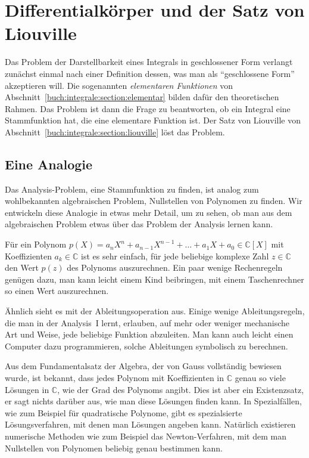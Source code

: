 %
%
%
\section{Differentialkörper und der Satz von Liouville
\label{buch:integrale:section:dkoerper}}
Das Problem der Darstellbarkeit eines Integrals in geschlossener
Form verlangt zunächst einmal nach einer Definition dessen, was man
als ``geschlossene Form'' akzeptieren will.
Die sogenannten {\em elementaren Funktionen} von
Abschnitt~\ref{buch:integrale:section:elementar}
bilden dafür den theoretischen Rahmen.
Das Problem ist dann die Frage zu beantworten, ob ein Integral eine
Stammfunktion hat, die eine elementare Funktion ist.
Der Satz von Liouville von Abschnitt~\ref{buch:integrale:section:liouville}
löst das Problem.

\subsection{Eine Analogie
\label{buch:integrale:section:analogie}}
Das Analysis-Problem, eine Stammfunktion zu finden, ist analog zum
wohlbekannten algebraischen Problem, Nullstellen von Polynomen zu finden.
Wir entwickeln diese Analogie in etwas mehr Detail, um zu sehen, ob man
aus dem algebraischen Problem etwas über das Problem der Analysis
lernen kann.

Für ein Polynom $p(X) = a_nX^n+a_{n-1}X^{n-1}+\dots+a_1X+a_0\in\mathbb{C}[X]$
mit Koeffizienten $a_k\in\mathbb{C}$ ist es sehr einfach, für jede beliebige
komplexe Zahl $z\in\mathbb{C}$ den Wert $p(z)$ des Polynoms auszurechnen.
Ein paar wenige Rechenregeln genügen dazu, man kann leicht einem Kind 
beibringen, mit einem Taschenrechner so einen Wert auszurechnen.

Ähnlich sieht es mit der Ableitungsoperation aus. 
Einige wenige Ableitungsregeln, die man in der Analysis~I lernt,
erlauben, auf mehr oder weniger mechanische Art und Weise, jede
beliebige Funktion abzuleiten.
Man kann auch leicht einen Computer dazu programmieren, solche Ableitungen
symbolisch zu berechnen.

Aus dem Fundamentalsatz der Algebra, der von Gauss vollständig bewiesen
wurde, ist bekannt, dass jedes Polynom mit Koeffizienten in $\mathbb{C}$
genau so viele Lösungen in $\mathbb{C}$, wie der Grad des Polynoms angibt.
Dies ist aber ein Existenzsatz, er sagt nichts darüber aus, wie man diese
Lösungen finden kann.
In Spezialfällen, wie zum Beispiel für quadratische Polynome, gibt
es spezialsierte Lösungsverfahren, mit denen man Lösungen angeben kann.
Natürlich existieren numerische Methoden wie zum Beispiel das
Newton-Verfahren, mit dem man Nullstellen von Polynomen beliebig genau
bestimmen kann.

